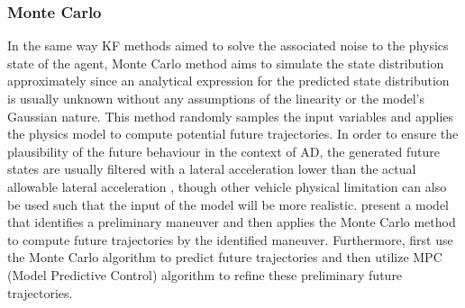 \subsubsection{Monte Carlo}
\label{subsubsec:2_monte_carlo_mp}

In the same way KF methods aimed to solve the associated noise to the physics state of the agent, Monte Carlo method aims to simulate the state distribution approximately since an analytical expression for the predicted state distribution is usually unknown without any assumptions of the linearity or the model’s Gaussian nature. This method randomly samples the input variables and applies the physics model to compute potential future trajectories. In order to ensure the plausibility of the future behaviour in the context of \ac{AD}, the generated future states are usually filtered with a lateral acceleration lower than the actual allowable lateral acceleration \cite{broadhurst2005monte}, though other vehicle physical limitation can also be used such that the input of the model will be more realistic. \cite{okamoto2017driver} present a model that identifies a preliminary maneuver and then applies the Monte Carlo method to compute future trajectories by the identified maneuver. Furthermore, \cite{wang2019trajectory} first use the Monte Carlo algorithm to predict future trajectories and then utilize MPC (Model Predictive Control) algorithm to refine these preliminary future trajectories.

